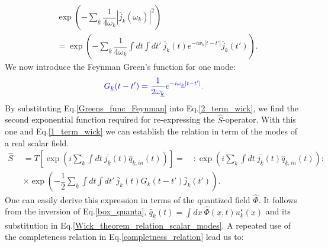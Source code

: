 \documentclass[12pt, titlepage]{article}
\begin{document}
\begin{equation}\label{2_term_wick}
\begin{split}
  &\exp
    \left(
       -
    \sum_{\underline{k}}
     	\dfrac{1}{4\omega_{\underline{k}}}
    	| \bar{j}_{\underline{k}}(\omega_{\underline{k}})|^2
    \right)	
 \\
 &=
      \exp
    \left(
       -
    \sum_{\underline{k}}
     	\dfrac{1}{4\omega_{\underline{k}}}
     	\int dt
		\!     	
     	\int dt'
     	\
     \bar{j}_{\underline{k}}(t)
     e^{-iw_{\underline{k}}|t-t'|} 
	          \bar{j}_{\underline{k}}(t')
    \right)	
    .
\end{split}
\end{equation}
We now introduce the Feynman Green's function for one mode:
\begin{equation}\label{Greens_func_Feynman}
 \textcolor[RGB]{0,0,204}{
 G_{\underline{k}}(t-t')=\dfrac{1}{2\omega_{\underline{k}}} e^{-i\omega_{\underline{k}} |t-t'|}
 .
}
\end{equation}
By substituting Eq.\enskip\eqref{Greens_func_Feynman} into Eq.\enskip\eqref{2_term_wick}, we find the second exponential function required for re-expressing the $ \hat{S} $-operator. With this one and Eq.\enskip\eqref{1_term_wick} we can establish the relation in term of the modes of a real scalar field.
\begin{equation}\label{Wick_theorem_relation_scalar_modes}
\begin{split}
\hat{S}&=	 T\left[
    \exp
    \left(
    i
    \sum_{\underline{k}}\int dt \ \bar{j_{\underline{k}}}(t) \hat{q}_{\underline{k},in}(t) 
    \right)
    \right]  
    =
    \quad
:
\exp
    \left(
    i
    \sum_{\underline{k}}\int dt \ \bar{j_{\underline{k}}}(t) \hat{q}_{\underline{k},in}(t) 
    \right)
    :  
      \\
   \quad   &\times 
          \exp
    \left(
       -
            	\dfrac{1}{2}
    \sum_{\underline{k}}
     	\int dt
		\!     	
     	\int dt'
     	\
     \bar{j}_{\underline{k}}(t)
     G_{k}(t-t')
	          \bar{j}_{\underline{k}}(t')
    \right)	
 .
\end{split}
\end{equation}
One can easily derive this expression in terms of the quantized field $\hat{ \Phi }$. It follows from the inversion of Eq.\enskip\eqref{box_quanta}, $ \hat{q}_{\underline{k}}(t) = \int \! dx \  \hat{ \Phi }(\underline{x},t)u^{\star}_{\underline{k}}(\underline{x}) $ and its substitution in Eq.\enskip\eqref{Wick_theorem_relation_scalar_modes}. A repeated use of the completeness relation in Eq.\enskip\eqref{completness_relation} lead us to:%
\end{document}
